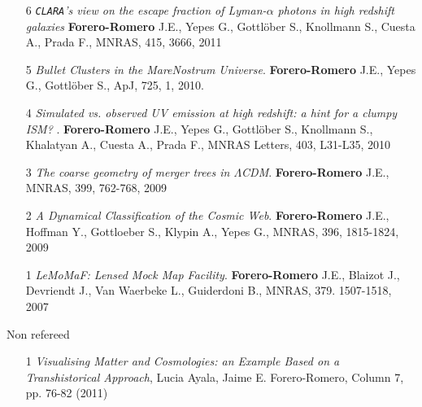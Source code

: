 \documentclass[9pt]{article}
\begin{document}
\begin{enumerate}
\item [6]
{\it {\tt CLARA}'s view on the escape fraction of Lyman-$\alpha$ photons in
  high redshift galaxies}
{\bf Forero-Romero} J.E., Yepes G., Gottl\"ober S., Knollmann S., Cuesta A., Prada F.,  
MNRAS, 415, 3666, 2011

\item [5]
{\it Bullet Clusters in the MareNostrum Universe}. 
{\bf Forero-Romero} J.E., Yepes G., Gottl\"ober S., 
ApJ, 725, 1, 2010.

\item [4]
{\it Simulated vs. observed UV emission at high redshift: a hint for a clumpy
ISM? }. 
{\bf Forero-Romero} J.E., Yepes G., Gottl\"ober S., Knollmann S., Khalatyan A., Cuesta A., Prada F.,   MNRAS Letters, 403,  L31-L35, 2010

\item [3]
{\it The coarse geometry of merger trees in
  $\Lambda$CDM}.  {\bf Forero-Romero} J.E., 
MNRAS, 399, 762-768, 2009

\item [2]
{\it A Dynamical Classification of the  Cosmic Web}.  {\bf Forero-Romero} J.E., Hoffman Y.,  Gottloeber S., Klypin A., Yepes G.,
MNRAS, 396, 1815-1824, 2009

\item [1] 
{\it {\sc LeMoMaF}:  Lensed Mock Map Facility}. 
{\bf Forero-Romero} J.E., Blaizot J., Devriendt J., Van Waerbeke L., Guiderdoni B., 
MNRAS, 379. 1507-1518, 2007
\end{enumerate}




Non refereed 
\begin{enumerate}
\item[1] {\it Visualising Matter and Cosmologies: an Example Based on
  a Transhistorical Approach}, Lucia Ayala, Jaime E. Forero-Romero,
  Column 7, pp. 76-82 (2011) 
\end{enumerate}
\end{document}
